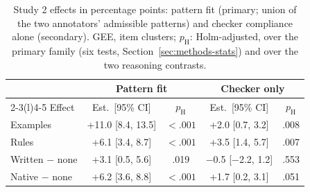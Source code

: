 \begin{table}
  \caption{Study 2 effects in percentage points: pattern fit (primary; union of the two annotators' admissible patterns) and checker compliance alone (secondary). GEE, item clusters; $p_{\mathrm{H}}$: Holm-adjusted, over the primary family (six tests, Section~\ref{sec:methods-stats}) and over the two reasoning contrasts.}
  \label{tab:2b-effects}
  \footnotesize
  \setlength{\tabcolsep}{3pt}
  \begin{tabular}{@{}lcccc@{}}
    \toprule
    & \multicolumn{2}{c}{Pattern fit} & \multicolumn{2}{c}{Checker only} \\
    \cmidrule(lr){2-3}\cmidrule(l){4-5}
    Effect & Est.\ [95\% CI] & $p_{\mathrm{H}}$ & Est.\ [95\% CI] & $p_{\mathrm{H}}$ \\
    \midrule
    Examples & +11.0 [8.4, 13.5] & $<.001$ & +2.0 [0.7, 3.2] & .008 \\
    Rules & +6.1 [3.4, 8.7] & $<.001$ & +3.5 [1.4, 5.7] & .007 \\
    Written $-$ none & +3.1 [0.5, 5.6] & .019 & $-$0.5 [$-$2.2, 1.2] & .553 \\
    Native $-$ none & +6.2 [3.6, 8.8] & $<.001$ & +1.7 [0.2, 3.1] & .051 \\
    \bottomrule
  \end{tabular}
\end{table}
